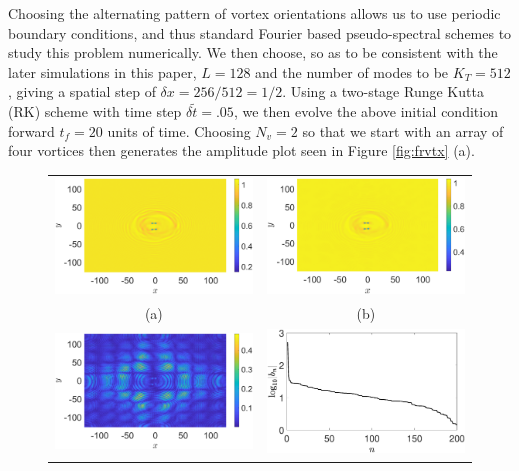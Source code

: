 \documentclass[a4paper,11pt]{article}
\begin{document}
Choosing the alternating pattern of vortex orientations allows us to use periodic boundary conditions, and thus standard Fourier based pseudo-spectral schemes to study this problem numerically.  We then choose, so as to be consistent with the later simulations in this paper, $L=128$ and the number of modes to be $K_{T}=512$, giving a spatial step of $\delta x = 256/512=1/2$.  Using a two-stage Runge Kutta (RK) scheme with time step $\delta\tilde{t} = .05$, we then evolve the above initial condition forward $t_{f}=20$ units of time.  Choosing $N_{v}=2$ so that we start with an array of four vortices then generates the amplitude plot seen in Figure \ref{fig:frvtx} (a).
\begin{figure}
\centering
\begin{tabular}{cc}
\includegraphics[width=.52\textwidth]{four_vortex_tf_20_K_256_Llx_128} &\hspace{-24pt} \includegraphics[width=.52\textwidth]{dmd1_four_vortex_tf_20_K_256_Llx_128}\\
(a) & (b)\\
 \includegraphics[width=.52\textwidth]{dmd2_four_vortex_tf_20_K_256_Llx_128} &\hspace{-24pt} \includegraphics[width=.52\textwidth]{dmd_mags_tf_20_K_256_Llx_128}\\

\end{tabular}
\end{figure}
\end{document}
